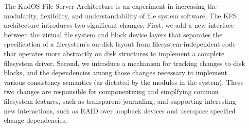 The KudOS File Server Architecture is an experiment in increasing the
modularity, flexibility, and understandability of file system software. The KFS
architecture introduces two significant changes. First, we add a new interface
between the virtual file system and block device layers that separates the
specification of a filesystem's on-disk layout from filesystem-independent code
that operates more abstractly on disk structures to implement a complete
filesystem driver. Second, we introduce a mechanism for tracking changes to disk
blocks, and the dependencies among those changes necessary to implement various
consistency semantics (as dictated by the modules in the system). These two
changes are responsible for componentizing and simplfying common filesystem
features, such as transparent journaling, and supporting interesting new
interactions, such as RAID over loopback devices and userspace specified change
dependencies.
